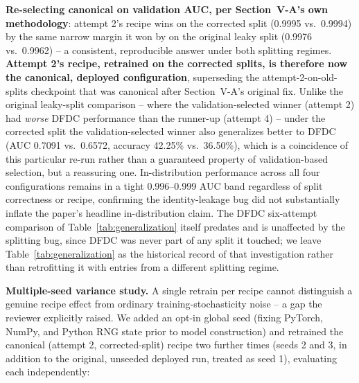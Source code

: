 \documentclass[conference]{IEEEtran}
\begin{document}
\textbf{Re-selecting canonical on validation AUC, per Section~V-A's own
methodology}: attempt 2's recipe wins on the corrected split (0.9995 vs.\
0.9994) by the same narrow margin it won by on the original leaky split
(0.9976 vs.\ 0.9962) -- a consistent, reproducible answer under both
splitting regimes. \textbf{Attempt 2's recipe, retrained on the corrected
splits, is therefore now the canonical, deployed configuration}, superseding
the attempt-2-on-old-splits checkpoint that was canonical after
Section~V-A's original fix. Unlike the original leaky-split comparison --
where the validation-selected winner (attempt 2) had \emph{worse} DFDC
performance than the runner-up (attempt 4) -- under the corrected split the
validation-selected winner also generalizes better to DFDC (AUC 0.7091 vs.\
0.6572, accuracy 42.25\% vs.\ 36.50\%), which is a coincidence of this
particular re-run rather than a guaranteed property of validation-based
selection, but a reassuring one. In-distribution performance across all
four configurations remains in a tight 0.996--0.999 AUC band regardless of
split correctness or recipe, confirming the identity-leakage bug did not
substantially inflate the paper's headline in-distribution claim. The DFDC
six-attempt comparison of Table~\ref{tab:generalization} itself predates
and is unaffected by the splitting bug, since DFDC was never part of any
split it touched; we leave Table~\ref{tab:generalization} as the historical
record of that investigation rather than retrofitting it with entries from
a different splitting regime.

\textbf{Multiple-seed variance study.} A single retrain per recipe cannot
distinguish a genuine recipe effect from ordinary training-stochasticity
noise -- a gap the reviewer explicitly raised. We added an opt-in global
seed (fixing PyTorch, NumPy, and Python RNG state prior to model
construction) and retrained the canonical (attempt 2, corrected-split)
recipe two further times (seeds 2 and 3, in addition to the original,
unseeded deployed run, treated as seed 1), evaluating each independently:
\end{document}
